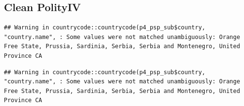 \documentclass[
]{article}
\newenvironment{Shaded}{\begin{snugshade}}{\end{snugshade}}
\newcommand{\KeywordTok}[1]{\textcolor[rgb]{0.13,0.29,0.53}{\textbf{#1}}}
\newcommand{\NormalTok}[1]{#1}
\newcommand{\OperatorTok}[1]{\textcolor[rgb]{0.81,0.36,0.00}{\textbf{#1}}}
\newcommand{\StringTok}[1]{\textcolor[rgb]{0.31,0.60,0.02}{#1}}
\begin{document}
\begin{Shaded}
\end{Shaded}

\hypertarget{clean-polityiv}{%
\subsection{Clean PolityIV}\label{clean-polityiv}}

\begin{Shaded}
\end{Shaded}

\begin{verbatim}
## Warning in countrycode::countrycode(p4_psp_sub$country, "country.name", : Some values were not matched unambiguously: Orange Free State, Prussia, Sardinia, Serbia, Serbia and Montenegro, United Province CA
\end{verbatim}

\begin{Shaded}
\end{Shaded}

\begin{verbatim}
## Warning in countrycode::countrycode(p4_psp_sub$country, "country.name", : Some values were not matched unambiguously: Orange Free State, Prussia, Sardinia, Serbia, Serbia and Montenegro, United Province CA
\end{verbatim}
\end{document}
